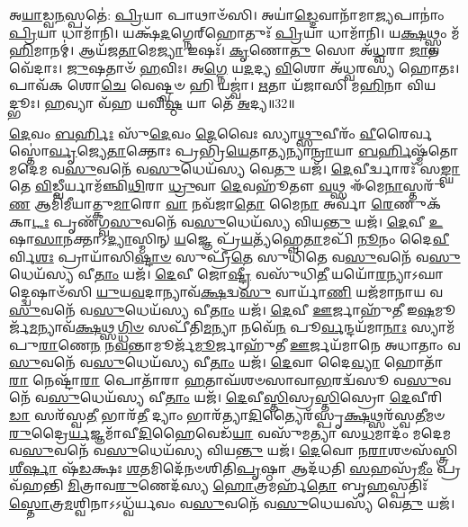 𑌅\-\ul{𑌯𑌾}\-𑌡𑍍𑌵\-\ul{𑌨}\-𑌸𑍍𑌪𑌤𑍇॑: \ul{𑌪𑍍𑌰𑌿}\-𑌯𑌾 𑌪𑌾𑌥𑌾𑍞᳴𑌸𑌿।
𑌅𑌯𑌾॑\-\ul{𑌡𑍍𑌦𑍇}\-𑌵𑌾𑌨𑌾᳴𑌮𑌾\-\ul{𑌜𑍍𑌯}\-𑌪𑌾𑌨𑌾𑌂॑ \ul{𑌪𑍍𑌰𑌿}\-𑌯𑌾 𑌧𑌾𑌮𑌾᳴𑌨𑌿।
𑌯𑌕𑍍𑌷᳴\-\ul{𑌦}\-𑌗𑍍𑌨𑍇𑌰𑍍‌\mbox{}𑌹𑍋𑌤𑍁𑌃᳴ \ul{𑌪𑍍𑌰𑌿}\-𑌯𑌾 𑌧𑌾𑌮𑌾᳴𑌨𑌿।
𑌯\-\ul{𑌕𑍍𑌷}\-𑌥𑍍𑌸𑍍𑌵𑌂 𑌮᳴\-\ul{𑌹𑌿}\-𑌮𑌾𑌨𑌮𑍍॑।
𑌆𑌯᳴𑌜\-\ul{𑌤𑌾}\-𑌮𑍇\-\ul{𑌜𑍍𑌯𑌾} 𑌇𑌷𑌃᳴।
\-\ul{𑌕𑍃}\-𑌣𑍋\-\ul{𑌤𑍁} 𑌸𑍋 𑌅᳴\-\ul{𑌧𑍍𑌵}\-𑌰𑌾 \ul{𑌜𑌾}\-𑌤𑌵𑍇᳴𑌦𑌾𑌃।
\-\ul{𑌜𑍁}\-𑌷𑌤𑌾𑍞᳴ \ul{𑌹}\-𑌵𑌿𑌃।
𑌅\-\ul{𑌗𑍍𑌨𑍇} 𑌯\-\ul{𑌦}\-𑌦𑍍𑌯 \ul{𑌵𑌿}\-𑌶𑍋 𑌅᳴𑌧𑍍𑌵𑌰𑌸𑍍𑌯 𑌹𑍋𑌤𑌃।
𑌪𑌾𑌵᳴𑌕 𑌶𑍋\-\ul{𑌚𑍇} 𑌵𑍇𑌷𑍍𑌟𑍍𑌵𑍞 𑌹𑌿 𑌯𑌜𑍍𑌵𑌾॑।
\-\ul{𑌋}\-𑌤𑌾 𑌯᳴𑌜𑌾𑌸𑌿 𑌮\-\ul{𑌹𑌿}\-𑌨𑌾 𑌵𑌿𑌯𑌦𑍍𑌭𑍂𑌃।
\-\ul{𑌹}\-𑌵𑍍𑌯𑌾 𑌵᳴𑌹 𑌯𑌵𑌿\-\ul{𑌷𑍍𑌠} 𑌯𑌾 𑌤𑍇᳴ \ul{𑌅}\-𑌦𑍍𑌯॥32॥\anuvakamend[𑌧𑌾𑌮𑌾᳴\-\ul{𑌨𑌿} 𑌭𑍂𑌰𑍇𑌕𑌂᳴ 𑌚]

\-\ul{𑌦𑍇}\-𑌵𑌂 \ul{𑌬}\-\-\ul{𑌰𑍍}\-𑌹𑌿𑌃 𑌸𑍁᳴\-\ul{𑌦𑍇}\-𑌵𑌂 \ul{𑌦𑍇}\-𑌵𑍈𑌃 𑌸𑍍𑌯𑌾\-\ul{𑌥𑍍𑌸𑍁}\-𑌵𑍀𑌰𑌂᳴ \ul{𑌵𑍀}\-𑌰𑍈𑌰𑍍𑌵𑌸𑍍𑌤𑍋॑\-\ul{𑌰𑍍𑌵𑍃}\-𑌜𑍍𑌯𑍇\-\ul{𑌤𑌾}\-𑌕𑍍𑌤𑍋𑌃 𑌪𑍍𑌰𑌭𑍍𑌰𑌿᳴\-\ul{𑌯𑍇}\-𑌤𑌾\-\ul{𑌤𑍍𑌯}\-𑌨𑍍𑌯𑌾\-\ul{𑌨𑍍𑌰𑌾}\-𑌯𑌾 \ul{𑌬}\-\-\ul{𑌰𑍍}\-𑌹𑌿𑌷𑍍𑌮᳴𑌤𑍋 𑌮𑌦𑍇𑌮 𑌵\-\ul{𑌸𑍁}\-𑌵𑌨𑍇᳴ 𑌵\-\ul{𑌸𑍁}\-𑌧𑍇𑌯᳴𑌸𑍍𑌯 𑌵𑍇\-\ul{𑌤𑍁} 𑌯𑌜᳴।
\-\ul{𑌦𑍇}\-𑌵𑍀𑌰𑍍𑌦𑍍𑌵𑌾𑌰𑌃᳴ 𑌸\-\ul{𑌙𑍍𑌘𑌾}\-𑌤𑍇 \ul{𑌵𑌿}\-𑌡𑍍𑌵𑍀𑌰𑍍𑌯𑌾𑌮᳴𑌞𑍍𑌛𑌿\-\ul{𑌥𑌿}\-𑌰𑌾 \ul{𑌧𑍍𑌰𑍁}\-𑌵𑌾 \ul{𑌦𑍇}\-𑌵𑌹𑍂᳴𑌤𑍗 \ul{𑌵}\-𑌥𑍍𑌸 𑌈᳴𑌮𑍇\-\ul{𑌨𑌾}\-𑌸𑍍𑌤𑌰𑍁᳴\-\ul{𑌣} 𑌆𑌮𑌿᳴𑌮𑍀𑌯𑌾𑌤𑍍𑌕𑍁\-\ul{𑌮𑌾}\-𑌰𑍋 \ul{𑌵𑌾} 𑌨𑌵᳴𑌜𑌾\-\ul{𑌤𑍋} 𑌮𑍈\-\ul{𑌨𑌾} 𑌅𑌰𑍍𑌵𑌾᳴ \ul{𑌰𑍇}\-𑌣𑍁𑌕᳴𑌕𑌾\-\ul{𑌟𑌃} 𑌪𑍃𑌣᳴𑌗𑍍𑌵\-\ul{𑌸𑍁}\-𑌵𑌨𑍇᳴ 𑌵\-\ul{𑌸𑍁}\-𑌧𑍇𑌯᳴𑌸𑍍𑌯 𑌵𑌿𑌯\-\ul{𑌨𑍍𑌤𑍁} 𑌯𑌜᳴।
\-\ul{𑌦𑍇}\-𑌵𑍀 \ul{𑌉}\-𑌷𑌾\-\ul{𑌸𑌾}\-𑌨𑌕𑍍𑌤𑌾\-𑌽\-\ul{𑌦𑍍𑌯𑌾}\-𑌸𑍍𑌮𑌿𑌨𑍍‌ \ul{𑌯}\-𑌜𑍍𑌞𑍇 𑌪𑍍𑌰᳴\-\ul{𑌯}\-𑌤𑍍𑌯᳴𑌹𑍍𑌵𑍇\-\ul{𑌤𑌾}\-𑌮𑌪𑌿᳴ \ul{𑌨𑍂}\-𑌨𑌂 𑌦𑍈\-\ul{𑌵𑍀}\-𑌰𑍍𑌵𑌿\-\ul{𑌶𑌃} 𑌪𑍍𑌰𑌾𑌯𑌾᳴𑌸𑌿\-\ul{𑌷𑍍𑌟𑌾}\-\-\ul{𑍞} 𑌸𑍁𑌪𑍍𑌰𑍀᳴\-\ul{𑌤𑍇} 𑌸𑍁𑌧𑌿᳴𑌤𑍇 𑌵\-\ul{𑌸𑍁}\-𑌵𑌨𑍇᳴ 𑌵\-\ul{𑌸𑍁}\-𑌧𑍇𑌯᳴𑌸𑍍𑌯 𑌵𑍀\-\ul{𑌤𑌾𑌂} 𑌯𑌜᳴।
\-\ul{𑌦𑍇}\-𑌵𑍀 𑌜𑍋\-\ul{𑌷𑍍𑌟𑍍𑌰𑍀} 𑌵𑌸𑍁᳴𑌧𑌿\-\ul{𑌤𑍀} 𑌯𑌯𑍋᳴\-\ul{𑌰}\-𑌨𑍍𑌯𑌾\-𑌽𑌘𑌾𑌦𑍍𑌦𑍍𑌵𑍇𑌷𑌾𑍞᳴𑌸𑌿 \ul{𑌯𑍁}\-𑌯\-\ul{𑌵}\-𑌦𑌾𑌨𑍍𑌯𑌾𑌵᳴\-\ul{𑌕𑍍𑌷}\-𑌦𑍍𑌵\-\ul{𑌸𑍁} 𑌵𑌾𑌰𑍍𑌯𑌾᳴\-\ul{𑌣𑌿} 𑌯𑌜᳴𑌮𑌾𑌨𑌾𑌯 𑌵\-\ul{𑌸𑍁}\-𑌵𑌨𑍇᳴ 𑌵\-\ul{𑌸𑍁}\-𑌧𑍇𑌯᳴𑌸𑍍𑌯 𑌵𑍀\-\ul{𑌤𑌾𑌂} 𑌯𑌜᳴।
\-\ul{𑌦𑍇}\-𑌵𑍀 \ul{𑌊}\-𑌰𑍍𑌜𑌾𑌹𑍁᳴\-\ul{𑌤𑍀} 𑌇\-\ul{𑌷}\-𑌮𑍂𑌰𑍍𑌜᳴\-\ul{𑌮}\-𑌨𑍍𑌯𑌾𑌵᳴\-\ul{𑌕𑍍𑌷}\-𑌥𑍍𑌸\-\ul{𑌗𑍍𑌧𑌿}\-\-\ul{𑍞} 𑌸𑌪𑍀᳴𑌤𑌿\-\ul{𑌮}\-𑌨𑍍𑌯𑌾 𑌨𑌵𑍇᳴\-\ul{𑌨} 𑌪𑍂\-\ul{𑌰𑍍𑌵}\-𑌨𑍍𑌦𑌯᳴𑌮𑌾\-\ul{𑌨𑌾𑌃} 𑌸𑍍𑌯𑌾𑌮᳴ 𑌪𑍁\-\ul{𑌰𑌾}\-𑌣𑍇\-\ul{𑌨} 𑌨\-\ul{𑌵}\-𑌨𑍍𑌤𑌾𑌮𑍂𑌰𑍍𑌜᳴\-\ul{𑌮𑍂}\-𑌰𑍍𑌜𑌾𑌹𑍁᳴𑌤𑍀 \ul{𑌊}\-𑌰𑍍𑌜𑌯᳴𑌮𑌾𑌨𑍇 𑌅𑌧𑌾𑌤𑌾𑌂 𑌵\-\ul{𑌸𑍁}\-𑌵𑌨𑍇᳴ 𑌵\-\ul{𑌸𑍁}\-𑌧𑍇𑌯᳴𑌸𑍍𑌯 𑌵𑍀\-\ul{𑌤𑌾𑌂} 𑌯𑌜᳴।
\-\ul{𑌦𑍇}\-𑌵𑌾 𑌦𑍈\-\ul{𑌵𑍍𑌯𑌾} 𑌹𑍋𑌤𑌾᳴\-\ul{𑌰𑌾} 𑌨𑍇𑌷𑍍𑌟𑌾᳴\-\ul{𑌰𑌾} 𑌪𑍋𑌤𑌾᳴𑌰𑌾 \ul{𑌹}\-𑌤𑌾𑌘᳴𑌶𑍞𑌸𑌾𑌵𑌾\-\ul{𑌭}\-𑌰𑌦𑍍𑌵᳴𑌸𑍂 𑌵\-\ul{𑌸𑍁}\-𑌵𑌨𑍇᳴ 𑌵\-\ul{𑌸𑍁}\-𑌧𑍇𑌯᳴𑌸𑍍𑌯 𑌵𑍀\-\ul{𑌤𑌾𑌂} 𑌯𑌜᳴।
\-\ul{𑌦𑍇}\-𑌵𑍀\-\ul{𑌸𑍍𑌤𑌿}\-𑌸𑍍𑌰\-\ul{𑌸𑍍𑌤𑌿}\-𑌸𑍍𑌰𑍋 \ul{𑌦𑍇}\-𑌵𑍀𑌰𑌿\-\ul{𑌡𑌾} 𑌸𑌰᳴𑌸𑍍𑌵\-\ul{𑌤𑍀} 𑌭𑌾𑌰᳴\-\ul{𑌤𑍀} 𑌦𑍍𑌯𑌾𑌂 𑌭𑌾𑌰᳴𑌤𑍍𑌯𑌾\-\ul{𑌦𑌿}\-𑌤𑍍𑌯𑍈𑌰᳴𑌸𑍍𑌪𑍃\-\ul{𑌕𑍍𑌷}\-𑌥𑍍𑌸𑌰᳴𑌸𑍍𑌵\-\ul{𑌤𑍀}\-𑌮𑍞 \ul{𑌰𑍁}\-𑌦𑍍𑌰𑍈\-\ul{𑌰𑍍𑌯}\-𑌜𑍍𑌞𑌮𑌾᳴𑌵𑍀\-\ul{𑌦𑌿}\-𑌹𑍈𑌵𑍇𑌡᳴\-\ul{𑌯𑌾} 𑌵𑌸𑍁᳴𑌮𑌤𑍍𑌯𑌾 𑌸\-\ul{𑌧}\-𑌮𑌾𑌦𑌂᳴ 𑌮𑌦𑍇𑌮 𑌵\-\ul{𑌸𑍁}\-𑌵𑌨𑍇᳴ 𑌵\-\ul{𑌸𑍁}\-𑌧𑍇𑌯᳴𑌸𑍍𑌯 𑌵𑌿𑌯\-\ul{𑌨𑍍𑌤𑍁} 𑌯𑌜᳴।
\-\ul{𑌦𑍇}\-𑌵𑍋 𑌨\-\ul{𑌰𑌾}\-𑌶𑍞𑌸᳴𑌸𑍍𑌤𑍍𑌰𑌿\-\ul{𑌶𑍀}\-\-\ul{𑌰𑍍}\-𑌷𑌾 𑌷᳴\-\ul{𑌡}\-𑌕𑍍𑌷𑌃 \ul{𑌶}\-𑌤𑌮𑌿𑌦𑍇᳴𑌨𑍞𑌶𑌿𑌤𑌿\-\ul{𑌪𑍃}\-𑌷𑍍𑌠𑌾 𑌆𑌦᳴𑌧𑌤𑌿 \ul{𑌸}\-𑌹𑌸𑍍𑌰᳴\-\ul{𑌮𑍀𑌂} 𑌪𑍍𑌰𑌵᳴𑌹𑌨𑍍𑌤𑌿 \ul{𑌮𑌿}\-𑌤𑍍𑌰𑌾𑌵\-\ul{𑌰𑍁}\-𑌣𑍇𑌦᳴𑌸𑍍𑌯 \ul{𑌹𑍋}\-𑌤𑍍𑌰𑌮𑌰𑍍\mbox{}𑌹᳴\-\ul{𑌤𑍋} 𑌬𑍃\-\ul{𑌹}\-𑌸𑍍𑌪𑌤𑌿𑌃᳴ \ul{𑌸𑍍𑌤𑍋}\-𑌤𑍍𑌰\-\ul{𑌮}\-𑌶𑍍𑌵𑌿𑌨𑌾\-𑌽𑌽𑌧𑍍𑌵᳴𑌰𑍍𑌯𑌵𑌂 𑌵\-\ul{𑌸𑍁}\-𑌵𑌨𑍇᳴ 𑌵\-\ul{𑌸𑍁}\-𑌧𑍇𑌯𑌸𑍍𑌯᳴ 𑌵𑍇\-\ul{𑌤𑍁} 𑌯𑌜᳴।
